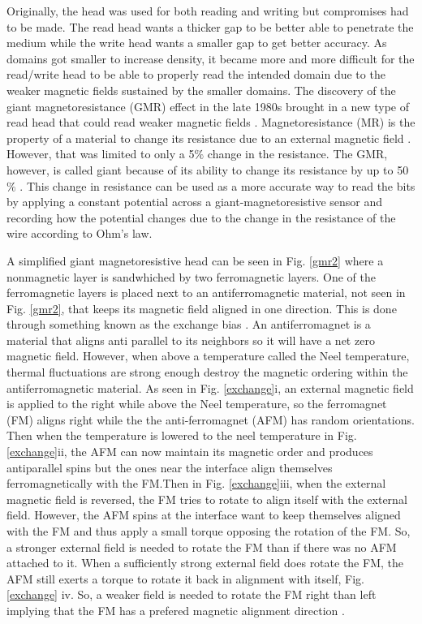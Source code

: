 \documentclass[ notitlepage, numerical, 11pt]{revtex4-1} %
\begin{document}
Originally, the head was used for both reading and writing but compromises had to be made. The read head wants a thicker gap to be better able to penetrate the medium while the write head wants a smaller gap to get better accuracy. As domains got smaller to increase density, it became more and more difficult for the read/write head to be able to properly read the intended domain due to the weaker magnetic fields sustained by the smaller domains. The discovery of the giant magnetoresistance (GMR) effect in the late 1980s brought in a new type of read head that could read weaker magnetic fields \cite{gmr}. Magnetoresistance (MR) is the property of a material to change its resistance due to an external magnetic field \cite{gmr}. However, that was limited to only a 5$\%$ change in the resistance. The GMR, however, is called giant because of its ability to change its resistance by up to 50$\%$ \cite{newGmr}. This change in resistance can be used as a more accurate way to read the bits by applying a constant potential across a giant-magnetoresistive sensor and recording how the potential changes due to the change in the resistance of the wire according to Ohm's law. 

A simplified giant magnetoresistive head can be seen in Fig. \ref{gmr2} where a nonmagnetic layer is sandwhiched by two ferromagnetic layers. One of the ferromagnetic layers is placed next to an antiferromagnetic material, not seen in Fig. \ref{gmr2}, that keeps its magnetic field aligned in one direction. This is done through something known as the exchange bias \cite{schull}. An antiferromagnet is a material that aligns anti parallel to its neighbors so it will have a net zero magnetic field. However, when above a temperature called the Neel temperature, thermal fluctuations are strong enough destroy the magnetic ordering within the antiferromagnetic material. As seen in Fig. \ref{exchange}i, an external magnetic field is applied to the right while above the Neel temperature, so the ferromagnet (FM) aligns right while the the anti-ferromagnet (AFM) has random orientations. Then when the temperature is lowered to the neel temperature in Fig. \ref{exchange}ii, the AFM can now maintain its magnetic order and produces antiparallel spins but the ones near the interface align themselves ferromagnetically with the FM.Then in Fig. \ref{exchange}iii, when the external magnetic field is reversed, the FM tries to rotate to align itself with the external field. However, the AFM spins at the interface want to keep themselves aligned with the FM and thus apply a small torque opposing the rotation of the FM. So, a stronger external field is needed to rotate the FM than if there was no AFM attached to it. When a sufficiently strong external field does rotate the FM, the AFM still exerts a torque to rotate it back in alignment with itself, Fig. \ref{exchange} iv. So, a weaker field is needed to rotate the FM right than left implying that the FM has a prefered magnetic alignment direction \cite{schull}.
\end{document}
